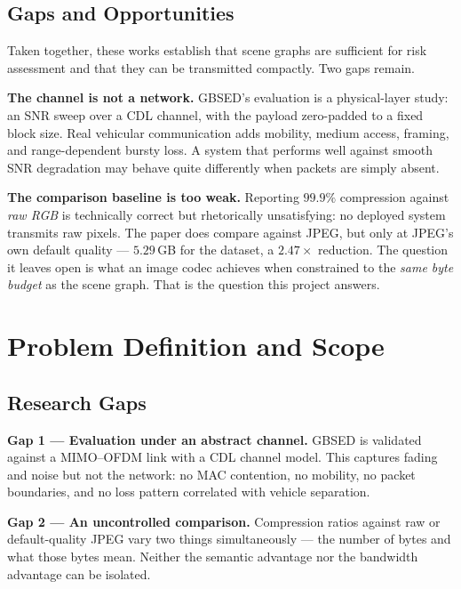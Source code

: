 \documentclass{iutbscthesis}
\begin{document}
\section{Gaps and Opportunities}

Taken together, these works establish that scene graphs are sufficient for risk
assessment and that they can be transmitted compactly. Two gaps remain.

\textbf{The channel is not a network.} GBSED's evaluation is a physical-layer
study: an SNR sweep over a CDL channel, with the payload zero-padded to a fixed
block size. Real vehicular communication adds mobility, medium access,
framing, and range-dependent bursty loss. A system that performs well against
smooth SNR degradation may behave quite differently when packets are simply
absent.

\textbf{The comparison baseline is too weak.} Reporting $99.9\%$ compression
against \emph{raw RGB} is technically correct but rhetorically unsatisfying:
no deployed system transmits raw pixels. The paper does compare against JPEG,
but only at JPEG's own default quality --- $5.29$\,GB for the dataset, a
$2.47\times$ reduction. The question it leaves open is what an image codec
achieves when constrained to the \emph{same byte budget} as the scene graph.
That is the question this project answers.

\chapter{Problem Definition and Scope} \label{chapter:problem}

\section{Research Gaps}

\textbf{Gap 1 --- Evaluation under an abstract channel.} GBSED is validated
against a MIMO--OFDM link with a CDL channel model. This captures fading and
noise but not the network: no MAC contention, no mobility, no packet
boundaries, and no loss pattern correlated with vehicle separation.

\textbf{Gap 2 --- An uncontrolled comparison.} Compression ratios against raw
or default-quality JPEG vary two things simultaneously --- the number of bytes
and what those bytes mean. Neither the semantic advantage nor the bandwidth
advantage can be isolated.
\end{document}
